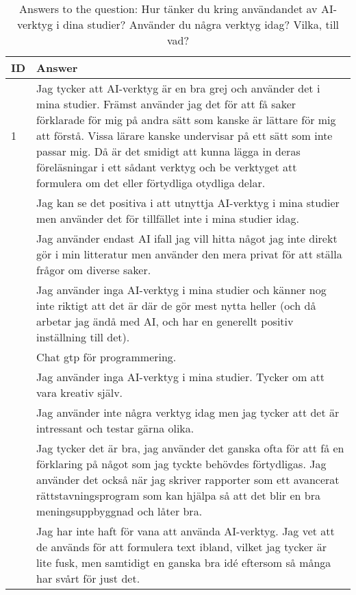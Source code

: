 \begin{table}[h]
\centering
{\small
\begin{tabularx}{\textwidth}{@{}lX@{}}
\toprule
\textbf{ID} & \textbf{Answer} \\ \midrule
1 & Jag tycker att AI-verktyg är en bra grej och använder det i mina studier. Främst använder jag det för att få saker förklarade för mig på andra sätt som kanske är lättare för mig att förstå. Vissa lärare kanske undervisar på ett sätt som inte passar mig. Då är det smidigt att kunna lägga in deras föreläsningar i ett sådant verktyg och be verktyget att formulera om det eller förtydliga otydliga delar. \\ \hdashline
2 & Jag kan se det positiva i att utnyttja AI-verktyg i mina studier men använder det för tillfället inte i mina studier idag. \\ \hdashline
3 & Jag använder endast AI ifall jag vill hitta något jag inte direkt gör i min litteratur men använder den mera privat för att ställa frågor om diverse saker. \\ \hdashline
4 & Jag använder inga AI-verktyg i mina studier och känner nog inte riktigt att det är där de gör mest nytta heller (och då arbetar jag ändå med AI, och har en generellt positiv inställning till det). \\ \hdashline
5 & Chat gtp för programmering. \\ \hdashline
6 & Jag använder inga AI-verktyg i mina studier. Tycker om att vara kreativ själv. \\ \hdashline
7 & Jag använder inte några verktyg idag men jag tycker att det är intressant och testar gärna olika. \\ \hdashline
8 & Jag tycker det är bra, jag använder det ganska ofta för att få en förklaring på något som jag tyckte behövdes förtydligas. Jag använder det också när jag skriver rapporter som ett avancerat rättstavningsprogram som kan hjälpa så att det blir en bra meningsuppbyggnad och låter bra. \\ \hdashline
9 & Jag har inte haft för vana att använda AI-verktyg. Jag vet att de används för att formulera text ibland, vilket jag tycker är lite fusk, men samtidigt en ganska bra idé eftersom så många har svårt för just det. \\
\bottomrule
\end{tabularx}
}
\vspace{2mm}
\caption{Answers to the question: Hur tänker du kring användandet av AI-verktyg i dina studier? Använder du några verktyg idag? Vilka, till vad?}
\label{tab:appendix_typeform_table_question_AI_tools}
\end{table}
